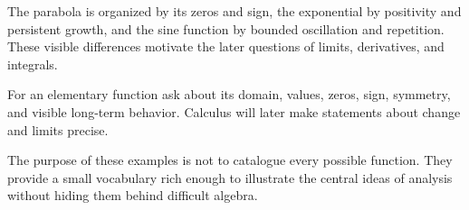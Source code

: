 \begin{interpretationbox}
The parabola is organized by its zeros and sign, the exponential by positivity and persistent growth, and the sine function by bounded oscillation and repetition. These visible differences motivate the later questions of limits, derivatives, and integrals.
\end{interpretationbox}

\begin{corebox}
For an elementary function ask about its domain, values, zeros, sign, symmetry, and visible long-term behavior. Calculus will later make statements about change and limits precise.
\end{corebox}

The purpose of these examples is not to catalogue every possible function. They provide a small vocabulary rich enough to illustrate the central ideas of analysis without hiding them behind difficult algebra.

